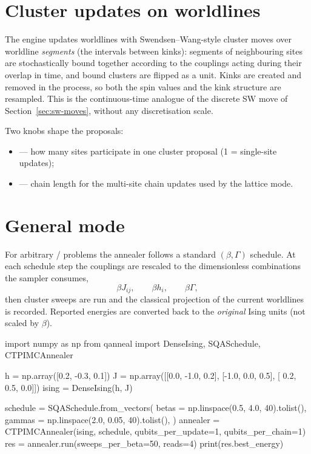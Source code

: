 \section{Cluster updates on worldlines}

The engine updates worldlines with Swendsen--Wang-style cluster moves over
worldline \emph{segments} (the intervals between kinks): segments of
neighbouring sites are stochastically bound together according to the
couplings acting during their overlap in time, and bound clusters are
flipped as a unit. Kinks are created and removed in the process, so both the
spin values and the kink structure are resampled. This is the
continuous-time analogue of the discrete SW move of
Section~\ref{sec:sw-moves}, without any discretisation scale.

Two knobs shape the proposals:
\begin{itemize}
\item {} --- how many sites participate in one
cluster proposal (1 = single-site updates);
\item {} --- chain length for the multi-site chain
updates used by the lattice mode.
\end{itemize}

\section{General mode}

For arbitrary / problems the annealer
follows a standard $(\beta,\Gamma)$ schedule. At each schedule step the
couplings are rescaled to the dimensionless combinations the sampler
consumes,
\begin{equation}
\beta J_{ij},\qquad \beta h_i,\qquad \beta\Gamma ,
\end{equation}
then  cluster sweeps are run and the classical
projection of the current worldlines is recorded. Reported energies are
converted back to the \emph{original} Ising units (not scaled by $\beta$).

\begin{pycode}
import numpy as np
from qanneal import DenseIsing, SQASchedule, CTPIMCAnnealer

h = np.array([0.2, -0.3, 0.1])
J = np.array([[0.0, -1.0, 0.2],
              [-1.0, 0.0, 0.5],
              [ 0.2, 0.5, 0.0]])
ising = DenseIsing(h, J)

schedule = SQASchedule.from_vectors(
    betas  = np.linspace(0.5, 4.0, 40).tolist(),
    gammas = np.linspace(2.0, 0.05, 40).tolist(),
)
annealer = CTPIMCAnnealer(ising, schedule,
                          qubits_per_update=1, qubits_per_chain=1)
res = annealer.run(sweeps_per_beta=50, reads=4)
print(res.best_energy)
\end{pycode}

